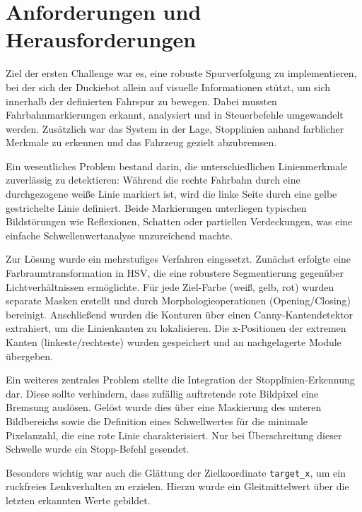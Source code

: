 
\section{Anforderungen und Herausforderungen}

Ziel der ersten Challenge war es, eine robuste Spurverfolgung zu implementieren, bei der sich der Duckiebot allein auf visuelle Informationen stützt, um sich innerhalb der definierten Fahrspur zu bewegen. Dabei mussten Fahrbahnmarkierungen erkannt, analysiert und in Steuerbefehle umgewandelt werden. Zusätzlich war das System in der Lage, Stopplinien anhand farblicher Merkmale zu erkennen und das Fahrzeug gezielt abzubremsen.

Ein wesentliches Problem bestand darin, die unterschiedlichen Linienmerkmale zuverlässig zu detektieren: Während die rechte Fahrbahn durch eine durchgezogene weiße Linie markiert ist, wird die linke Seite durch eine gelbe gestrichelte Linie definiert. Beide Markierungen unterliegen typischen Bildstörungen wie Reflexionen, Schatten oder partiellen Verdeckungen, was eine einfache Schwellenwertanalyse unzureichend machte.

Zur Lösung wurde ein mehrstufiges Verfahren eingesetzt. Zunächst erfolgte eine Farbraumtransformation in \ac{HSV}, die eine robustere Segmentierung gegenüber Lichtverhältnissen ermöglichte. Für jede Ziel-Farbe (weiß, gelb, rot) wurden separate Masken erstellt und durch Morphologieoperationen (Opening/Closing) bereinigt. Anschließend wurden die Konturen über einen Canny-Kantendetektor extrahiert, um die Linienkanten zu lokalisieren. Die x-Positionen der extremen Kanten (linkeste/rechteste) wurden gespeichert und an nachgelagerte Module übergeben.

Ein weiteres zentrales Problem stellte die Integration der Stopplinien-Erkennung dar. Diese sollte verhindern, dass zufällig auftretende rote Bildpixel eine Bremsung auslösen. Gelöst wurde dies über eine Maskierung des unteren Bildbereichs sowie die Definition eines Schwellwertes für die minimale Pixelanzahl, die eine rote Linie charakterisiert. Nur bei Überschreitung dieser Schwelle wurde ein Stopp-Befehl gesendet.

\newpage

Besonders wichtig war auch die Glättung der Zielkoordinate \texttt{target\_x}, um ein ruckfreies Lenkverhalten zu erzielen. Hierzu wurde ein Gleitmittelwert über die letzten erkannten Werte gebildet.

